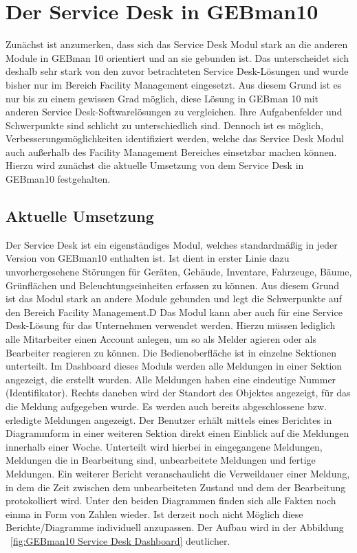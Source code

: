 
\section{Der Service Desk in GEBman10}
\noindent
Zunächst ist anzumerken, dass sich das Service Desk Modul stark an die anderen Module in GEBman 10 orientiert und an sie gebunden ist. Das unterscheidet sich deshalb sehr stark von den zuvor betrachteten Service Desk-Lösungen und wurde bisher nur im Bereich Facility Management eingesetzt. Aus diesem Grund ist es nur bis zu einem gewissen Grad möglich, diese Lösung in GEBman 10 mit anderen Service Desk-Softwarelösungen zu vergleichen. Ihre Aufgabenfelder und Schwerpunkte sind schlicht zu unterschiedlich sind. Dennoch ist es möglich, Verbesserungsmöglichkeiten identifiziert werden, welche das Service Desk Modul auch außerhalb des Facility Management Bereiches einsetzbar machen können. Hierzu wird zunächst die aktuelle Umsetzung von dem Service Desk in GEBman10 festgehalten.


\subsection{Aktuelle Umsetzung}
\noindent
Der Service Desk  ist ein eigenständiges Modul, welches standardmäßig in jeder Version von GEBman10 enthalten ist. Ist dient in erster Linie dazu unvorhergesehene Störungen für Geräten, Gebäude, Inventare, Fahrzeuge, Bäume, Grünflächen und Beleuchtungseinheiten erfassen zu können. Aus diesem Grund ist das Modul stark an andere Module gebunden und legt die Schwerpunkte auf den Bereich Facility Management.D Das Modul kann aber auch für eine Service Desk-Lösung für das Unternehmen verwendet werden. Hierzu müssen lediglich alle Mitarbeiter einen Account anlegen, um so als Melder agieren oder als Bearbeiter reagieren zu können. \newline 
Die Bedienoberfläche ist in einzelne Sektionen unterteilt. Im Dashboard dieses Moduls werden alle Meldungen in einer Sektion angezeigt, die erstellt wurden. Alle Meldungen haben eine eindeutige Nummer (Identifikator). Rechts daneben wird der Standort des Objektes angezeigt, für das die Meldung aufgegeben wurde. Es werden auch bereits abgeschlossene bzw. erledigte Meldungen angezeigt. Der Benutzer erhält mittels eines Berichtes in Diagrammform in einer weiteren Sektion direkt einen Einblick auf die Meldungen innerhalb einer Woche. Unterteilt wird hierbei in eingegangene Meldungen, Meldungen die in Bearbeitung sind, unbearbeitete Meldungen und fertige Meldungen. Ein weiterer Bericht veranschaulicht die Verweildauer einer Meldung, in dem die Zeit zwischen dem unbearbeiteten Zustand und dem der Bearbeitung protokolliert wird. Unter den beiden Diagrammen finden sich alle Fakten noch einma in Form von Zahlen wieder. Ist derzeit noch nicht Möglich diese Berichte/Diagramme individuell anzupassen. Der Aufbau wird in der Abbildung ~\ref{fig:GEBman10 Service Desk Dashboard} deutlicher. 

